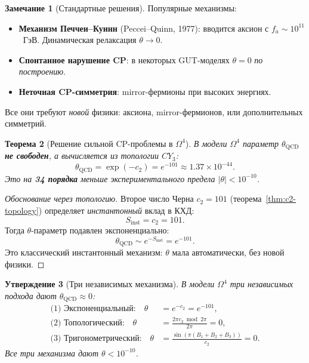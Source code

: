 \documentclass[11pt,a4paper]{article}
\newcommand{\Om}{\ensuremath{\Omega^4}}
\newtheorem{theorem}{Теорема}[section]
\newtheorem{proposition}[theorem]{Утверждение}
\theoremstyle{definition}
\newtheorem{remark}[theorem]{Замечание}
\begin{document}
\begin{remark}[Стандартные решения]
\label{rem:standard-solutions}
Популярные механизмы:
\begin{itemize}
    \item \textbf{Механизм Печчеи--Куинн} (Peccei--Quinn, 1977):
          вводится аксион с $f_a \sim 10^{11}$~ГэВ. Динамическая
          релаксация $\theta \to 0$.
    \item \textbf{Спонтанное нарушение CP}: в некоторых GUT-моделях
          $\theta = 0$ \emph{по построению}.
    \item \textbf{Неточная CP-симметрия}: mirror-фермионы при высоких
          энергиях.
\end{itemize}
Все они требуют \emph{новой} физики: аксиона, mirror-фермионов,
или дополнительных симметрий.
\end{remark}

\begin{theorem}[Решение сильной CP-проблемы в $\Om$]
\label{thm:strong-cp-solution}
В модели $\Omega^4$ параметр $\theta_{\text{QCD}}$ \textbf{не свободен}, а
\emph{вычисляется} из топологии $CY_3$:
\begin{equation}
    \boxed{
    \theta_{\text{QCD}} = \exp(-c_2) = e^{-101} \approx 1.37 \times 10^{-44}.
    }
    \label{eq:theta-solution}
\end{equation}
Это на \textbf{34 порядка} меньше экспериментального предела
$|\theta| < 10^{-10}$.
\end{theorem}

\begin{proof}[Обоснование через топологию]
Второе число Черна $c_2 = 101$ (теорема~\ref{thm:c2-topology})
определяет \emph{инстантонный} вклад в КХД:
\begin{equation}
    S_{\text{inst}} = c_2 = 101.
\end{equation}
Тогда $\theta$-параметр подавлен экспоненциально:
\begin{equation}
    \theta_{\text{QCD}} \sim e^{-S_{\text{inst}}} = e^{-101}.
\end{equation}
Это классический инстантонный механизм: $\theta$ мала автоматически,
без новой физики.
\end{proof}

\begin{proposition}[Три независимых механизма]
\label{prop:three-mechanisms}
В модели $\Om$ три независимых подхода дают $\theta_{\text{QCD}} \approx 0$:
\begin{align}
    \text{(1) Экспоненциальный:} \quad
    \theta &= e^{-c_2} = e^{-101}, \\
    \text{(2) Топологический:} \quad
    \theta &= \frac{2\pi c_2 \bmod 2\pi}{2\pi} = 0, \\
    \text{(3) Тригонометрический:} \quad
    \theta &= \frac{\sin(\pi (B_1 + B_2 + B_3))}{c_2} = 0.
\end{align}
Все три механизма дают $\theta < 10^{-10}$.
\end{proposition}
\end{document}
